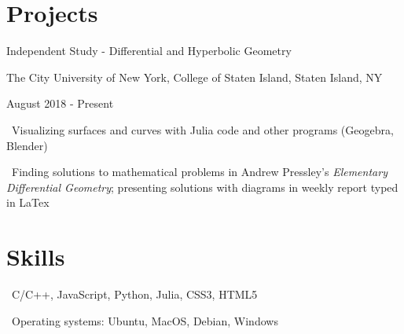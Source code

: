 \documentclass[letterpaper]{article}
\renewenvironment{itemize}{
  \begin{list}{}{
    \setlength{\leftmargin}{1.5em}
  }
}{
  \end{list}
}
\begin{document}
\section*{Projects}

\begin{itemize}
  \item Independent Study - Differential and Hyperbolic Geometry
  
  The City University of New York, College of Staten Island, Staten Island, NY
  
  August 2018 - Present

  \begin{itemize}
    \item \textperiodcentered \ Visualizing surfaces and curves with Julia code and other programs (Geogebra, Blender)
	\item \textperiodcentered \ Finding solutions to mathematical problems in Andrew Pressley's \emph{Elementary Differential Geometry}; presenting solutions with diagrams in weekly report typed in LaTex

  \end{itemize}
\end{itemize}

\section*{Skills}
\begin{itemize}
  \item \textperiodcentered \ C/C++, JavaScript, Python, Julia, CSS3, HTML5
  \item \textperiodcentered \ Operating systems: Ubuntu, MacOS, Debian, Windows
\end{itemize}

\bigskip
\end{document}
